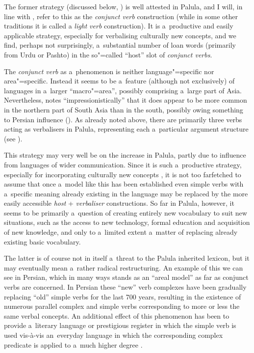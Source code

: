 The former strategy (discussed below, ) is well attested in Palula, and I will, in line with \citet[326]{masica1991}, refer to this as the \textit{conjunct verb} construction (while in some other traditions it is called a \textit{light} \textit{verb} construction). It is a~productive and easily applicable strategy, especially for verbalising culturally new concepts, and we find, perhaps not surprisingly, a~substantial number of loan words (primarily from Urdu or Pashto) in the so"=called ``host'' slot of \textit{conjunct verbs}. 



The \textit{conjunct verb} as a~phenomenon is neither language"=specific nor area"=specific. Instead it seems to be a~feature (although not exclusively) of languages in a~larger ``macro"=area'', possibly comprising a~large part of Asia. Nevertheless, \citeauthor{masica1991} notes ``impressionistically'' that it does appear to be more common in the northern part of South Asia than in the south, possibly owing something to Persian influence (\citeyear[368]{masica1991}). As already noted above, there are primarily three verbs acting as verbalisers in Palula, representing each a~particular argument structure (see ). 



This strategy may very well be on the increase in Palula, partly due to influence from languages of wider communication. Since it is such a~productive strategy, especially for incorporating culturally new concepts \citep[85]{gambhir1993}, it is not too farfetched to assume that once a~model like this has been established even simple verbs with a~specific meaning already existing in the language may be replaced by the more easily accessible \textit{host} + \textit{verbaliser} constructions. So far in Palula, however, it seems to be primarily a~question of creating entirely new vocabulary to suit new situations, such as the access to new technology, formal education and acquisition of new knowledge, and only to a~limited extent a~matter of replacing already existing basic vocabulary. 



The latter is of course not in itself a~threat to the Palula inherited lexicon, but it may eventually mean a~rather radical restructuring. An example of this we can see in Persian, which in many ways stands as an ``areal model'' as far as conjunct verbs are concerned. In Persian these ``new'' verb complexes have been gradually replacing ``old'' simple verbs for the last 700 years, resulting in the existence of numerous parallel complex and simple verbs corresponding to more or less the same verbal concepts. An additional effect of this phenomenon has been to provide a~literary language or prestigious register in which the simple verb is used vis-à-vis an~everyday language in which the corresponding complex predicate is applied to a~much higher degree \citep[1369]{follietal2005}. 



